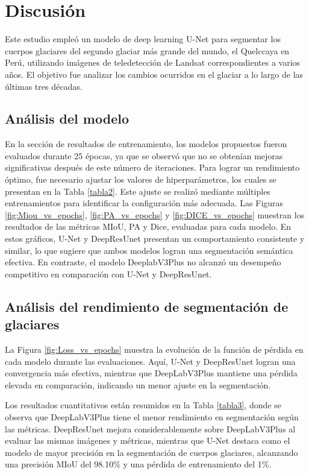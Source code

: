\chapter*{Discusión}
\doublespacing
Este estudio empleó un modelo de deep learning U-Net para segmentar los cuerpos glaciares del segundo glaciar más grande del mundo, el Quelccaya en Perú, utilizando imágenes de teledetección de Landsat correspondientes a varios años. El objetivo fue analizar los cambios ocurridos en el glaciar a lo largo de las últimas tres décadas.
\section{Análisis del modelo}
En la sección de resultados de entrenamiento, los modelos propuestos fueron evaluados durante 25 épocas, ya que se observó que no se obtenían mejoras significativas después de este número de iteraciones. Para lograr un rendimiento óptimo, fue necesario ajustar los valores de hiperparámetros, los cuales se presentan en la Tabla \ref{tabla2}. Este ajuste se realizó mediante múltiples entrenamientos para identificar la configuración más adecuada. Las Figuras \ref{fig:Miou_vs_epochs}, \ref{fig:PA_vs_epochs} y \ref{fig:DICE_vs_epochs} muestran los resultados de las métricas MIoU, PA y Dice, evaluadas para cada modelo. En estos gráficos, U-Net y DeepResUnet presentan un comportamiento consistente y similar, lo que sugiere que ambos modelos logran una segmentación semántica efectiva. En contraste, el modelo DeeplabV3Plus no alcanzó un desempeño competitivo en comparación con U-Net y DeepResUnet.

\section{Análisis del rendimiento de segmentación de glaciares}

La Figura \ref{fig:Loss_vs_epochs} muestra la evolución de la función de pérdida en cada modelo durante las evaluaciones. Aquí, U-Net y DeepResUnet logran una convergencia más efectiva, mientras que DeepLabV3Plus mantiene una pérdida elevada en comparación, indicando un menor ajuste en la segmentación.

Los resultados cuantitativos están resumidos en la Tabla \ref{tabla3}, donde se observa que DeepLabV3Plus tiene el menor rendimiento en segmentación según las métricas. DeepResUnet mejora considerablemente sobre DeepLabV3Plus al evaluar las mismas imágenes y métricas, mientras que U-Net destaca como el modelo de mayor precisión en la segmentación de cuerpos glaciares, alcanzando una precisión MIoU del 98.10\% y una pérdida de entrenamiento del 1\%.

